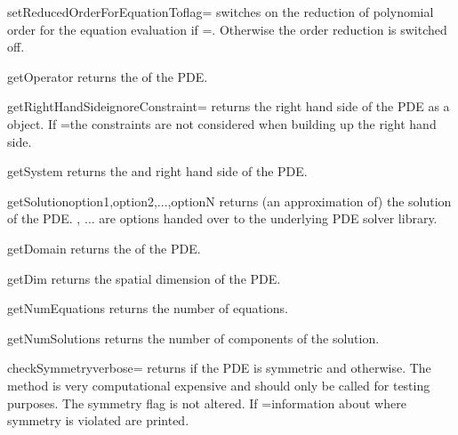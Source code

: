 \begin{methoddesc}[LinearPDE]{setReducedOrderForEquationTo}{flag=\False}
switches on the reduction of polynomial order for the equation 
evaluation if =\True. Otherwise
the order reduction is switched off.
\end{methoddesc}

\begin{methoddesc}[LinearPDE]{getOperator}{}
returns the \Operator of the PDE.
\end{methoddesc}

\begin{methoddesc}[LinearPDE]{getRightHandSide}{ignoreConstraint=\False}
returns the right hand side of the PDE as a \Data object. If
=\True the constraints are not considered
when building up the right hand side.
\end{methoddesc}

\begin{methoddesc}[LinearPDE]{getSystem}{}
returns the \Operator and right hand side of the PDE.
\end{methoddesc}

\begin{methoddesc}[LinearPDE]{getSolution}{option1,option2,...,optionN}
returns (an approximation of) the solution of the PDE. ,   
$\ldots$  are options handed over to the underlying PDE solver library.  
\end{methoddesc}

\begin{methoddesc}[LinearPDE]{getDomain}{}
returns the \Domain of the PDE.
\end{methoddesc}

\begin{methoddesc}[LinearPDE]{getDim}{}
returns the spatial dimension of the PDE.
\end{methoddesc}

\begin{methoddesc}[LinearPDE]{getNumEquations}{}
returns the number of equations.
\end{methoddesc}

\begin{methoddesc}[LinearPDE]{getNumSolutions}{}
returns the number of components of the solution.
\end{methoddesc}

\begin{methoddesc}[LinearPDE]{checkSymmetry}{verbose=\False}
returns \True if the PDE is symmetric and \False otherwise. 
The method is very computational expensive and should only be 
called for testing purposes. The symmetry flag is not altered.
If =\True information about where symmetry is violated
are printed.
\end{methoddesc}

